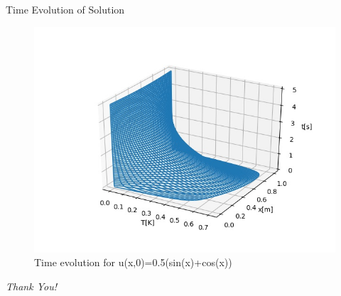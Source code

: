 \documentclass[10pt,compress]{beamer}
\begin{document}
\begin{frame}{Time Evolution of Solution}
\begin{figure}
\begin{center}
	\includegraphics[scale=0.5]{../plots/evol_0500_2000.jpg}
	\caption{Time evolution for u(x,0)=0.5(sin(x)+cos(x))}
	\label{fig:sin-evol}
\end{center}
\end{figure}
\end{frame}


\begin{frame}{}
\centering \Huge
	\emph{Thank You!}
\end{frame}
\end{document}
